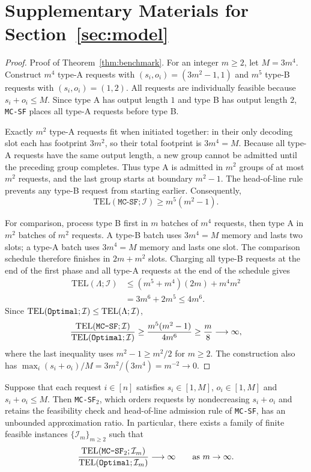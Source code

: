 \documentclass[nonblindrev]{informs3_hide}
\newcommand{\mcsdf}{\texttt{MC-SF}}
\newcommand{\mcsdff}{\texttt{MC-SF$_2$}}
\newcommand{\opt}{\texttt{Optimal}}
\begin{document}
\section{Supplementary Materials for Section~\ref{sec:model}} \label{append:model}

\begin{proof}{Proof of Theorem~\ref{thm:benchmark}.}
For an integer $m\ge2$, let $M=3m^4$. Construct $m^4$ type-A requests
with $(s_i,o_i)=(3m^2-1,1)$ and $m^5$ type-B requests with
$(s_i,o_i)=(1,2)$. All requests are individually feasible because
$s_i+o_i\le M$. Since type A has output length $1$ and type B has output
length $2$, \mcsdf{} places all type-A requests before type B.

Exactly $m^2$ type-A requests fit when initiated together: in their only
decoding slot each has footprint $3m^2$, so their total footprint is
$3m^4=M$. Because all type-A requests have the same output length, a new
group cannot be admitted until the preceding group completes. Thus type A
is admitted in $m^2$ groups of at most $m^2$ requests, and the last group
starts at boundary $m^2-1$. The head-of-line rule prevents any type-B
request from starting earlier. Consequently,
\[
\mathrm{TEL}(\mcsdf;\mathcal I)
\ge m^5(m^2-1).
\]

For comparison, process type B first in $m$ batches of $m^4$ requests,
then type A in $m^2$ batches of $m^2$ requests. A type-B batch uses
$3m^4=M$ memory and lasts two slots; a type-A batch uses $3m^4=M$
memory and lasts one slot. The comparison schedule therefore finishes
in $2m+m^2$ slots. Charging all type-B requests at the end of the first
phase and all type-A requests at the end of the schedule gives
\[
\begin{aligned}
\mathrm{TEL}(\Lambda;\mathcal I)
&\le (m^5+m^4)(2m)+m^4m^2\\
&=3m^6+2m^5\le4m^6.
\end{aligned}
\]
Since $\mathrm{TEL}(\textup{\opt};\mathcal I)\le
\mathrm{TEL}(\Lambda;\mathcal I)$,
\[
\frac{\mathrm{TEL}(\mcsdf;\mathcal I)}
     {\mathrm{TEL}(\textup{\opt};\mathcal I)}
\ge\frac{m^5(m^2-1)}{4m^6}
\ge\frac m8\longrightarrow\infty,
\]
where the last inequality uses $m^2-1\ge m^2/2$ for $m\ge2$.
The construction also has
$\max_i(s_i+o_i)/M=3m^2/(3m^4)=m^{-2}\to0$.
\Halmos
\end{proof}

\begin{theorem} \label{thm:benchmark2}
    Suppose that each request $i \in [n]$ satisfies $s_i \in [1,M]$, $o_i \in [1,M]$ and $s_i+o_i \leq M$. Then \mcsdff{}, which orders requests by nondecreasing $s_i+o_i$ and retains the feasibility check and head-of-line admission rule of \mcsdf{}, has an unbounded approximation ratio. In particular, there exists a family of finite feasible instances $\{\mathcal I_m\}_{m\ge2}$ such that
    \[
    \frac{\mathrm{TEL}(\textup{\mcsdff};\mathcal I_m)}
         {\mathrm{TEL}(\textup{\opt};\mathcal I_m)}
    \longrightarrow\infty
    \qquad\text{as }m\to\infty.
    \]
\end{theorem}
\end{document}
